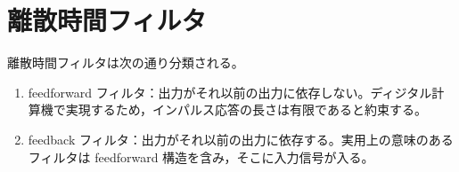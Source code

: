 \chapter{離散時間フィルタ}
    離散時間フィルタは次の通り分類される。
    \begin{enumerate}
        \item feedforward フィルタ：出力がそれ以前の出力に依存しない。ディジタル計算機で実現するため，インパルス応答の長さは有限であると約束する。
        \item feedback フィルタ：出力がそれ以前の出力に依存する。実用上の意味のあるフィルタは feedforward 構造を含み，そこに入力信号が入る。
    \end{enumerate}
    
    
    
